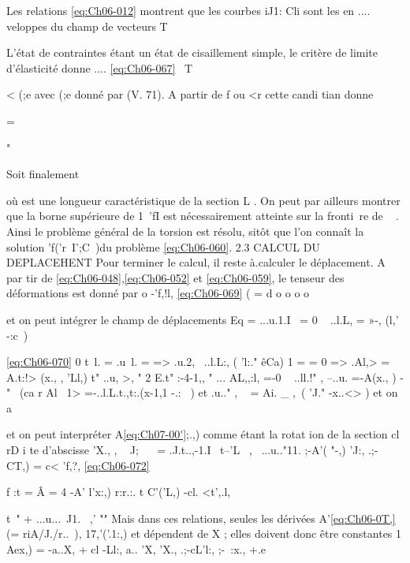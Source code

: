 Les relations \eqref{eq:Ch06-012} montrent que les courbes iJ1: Cli sont les en­
.... 
veloppes du champ de vecteurs T 

L'état de contraintes étant un état de cisaillement simple, le critère de limite d'élasticité donne 
.... 
\eqref{eq:Ch06-067} \ T \ ~ 

< (;e 
avec (;e donné par (V. 71). A partir de f ou <r cette candi tian donne 

= 

" 

Soit finalement 

où est une longueur caractéristique de la section L . On peut par ail­leurs montrer que la borne supérieure de 1~'fI est nécessairement atteinte sur la fronti~re de ~ . Ainsi le problème général de la torsion est résolu, sitôt que l'on connaît la solution 'f('r~I';C~)du problème \eqref{eq:Ch06-060}. 
2.3 CALCUL DU DEPLACEHENT 
Pour terminer le calcul, il reste à.calculer le déplacement. A par­
tir de \eqref{eq:Ch06-048},\eqref{eq:Ch06-052} et \eqref{eq:Ch06-059}, le tenseur des déformations est donné par 
o 
-'f,!l, 
\eqref{eq:Ch06-069} ( = d o o o o 

et on peut intégrer le champ de déplacements 
Eq = ...u.1.I~ = 0 ~ ..l.L, = »-, (l,' -:c~) 

\eqref{eq:Ch06-070} 0
t~l. = .u~l. = => .u.2,~ ..l.L:, ( 'l:." êCa)
1
{ 
= = 0 => .Al,> = A.t:!> (x., , 'Ll,)
t" ..u, >, " 
2 E.t" :-4-1,, " ... AL,,:l, =-0 ~ ..ll.!" , --..u. =-A(x., )
-"~ (ca r Al ~}1> =-..l.L.t.,t:.(x-1,1 -.: ~) et .u.." , ~ = Ai. _ ,~( 'J." -x..<> ) et on a 

et on peut interpréter A\eqref{eq:Ch07-00'};.,) comme étant la rotat ion de la section cl rD i te 
d'abscisse 
'X., 
, 
~
J; ~~ = .J.t..,-1.I~ t--'L~ ,~ ...u.."11. ;-A'( "-,) 'J:, .;-\) CT,) = c< 'f,?,
\eqref{eq:Ch06-072} 


f :t = Â 	= 4 -A' l'x:,) r:r.:. t C'('L,) -cl. <t',.l,

t~" + ...u...~J1.
~,' 
"" 
Mais dans ces relations, seules les dérivées A'\eqref{eq:Ch06-0T,}(= riA/J./r..~), 17,'('.1:,) et dépendent de X ; elles doivent donc être constantes 
1 
Aex,) = -a..X, + cl 
-Ll:, a.. 'X, 'X., .;-cL'l:, ;-~:x., +.e

